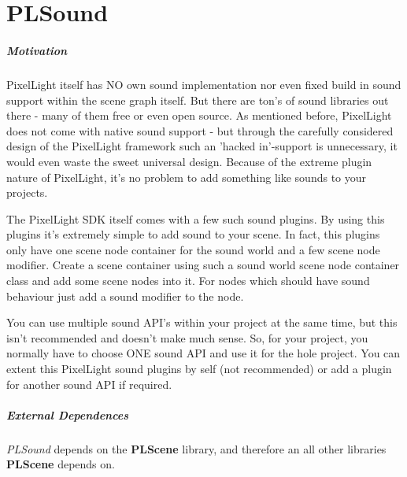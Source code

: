 \chapter{PLSound}


\paragraph{Motivation}
PixelLight itself has NO own sound implementation nor even fixed build in sound support within the scene graph itself. But there are ton's of sound libraries out there - many of them free or even open source. As mentioned before, PixelLight does not come with native sound support - but through the carefully considered design of the PixelLight framework such an 'hacked in'-support is unnecessary, it would even waste the sweet universal design. Because of the extreme plugin nature of PixelLight, it's no problem to add something like sounds to your projects.

The PixelLight SDK itself comes with a few such sound plugins. By using this plugins it's extremely simple to add sound to your scene. In fact, this plugins only have one scene node container for the sound world and a few scene node modifier. Create a scene container using such a sound world scene node container class and add some scene nodes into it. For nodes which should have sound behaviour just add a sound modifier to the node.

You can use multiple sound API's within your project at the same time, but this isn't recommended and doesn't make much sense. So, for your project, you normally have to choose ONE sound API and use it for the hole project. You can extent this PixelLight sound plugins by self (not recommended) or add a plugin for another sound API if required.


\paragraph{External Dependences}
\emph{PLSound} depends on the \textbf{PLScene} library, and therefore an all other libraries \textbf{PLScene} depends on.






\cleardoublepage

